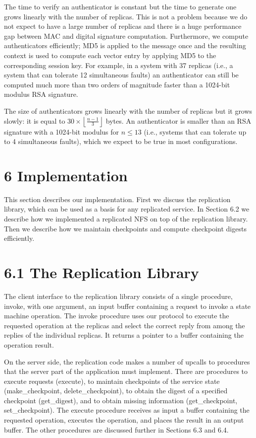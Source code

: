 \documentclass[
]{article}
\begin{document}
The time to verify an authenticator is constant but the time to generate
one grows linearly with the number of replicas. This is not a problem
because we do not expect to have a large number of replicas and there is
a huge performance gap between MAC and digital signature computation.
Furthermore, we compute authenticators efficiently; MD5 is applied to
the message once and the resulting context is used to compute each
vector entry by applying MD5 to the corresponding session key. For
example, in a system with 37 replicas (i.e., a system that can tolerate
12 simultaneous faults) an authenticator can still be computed much more
than two orders of magnitude faster than a 1024-bit modulus RSA
signature.

The size of authenticators grows linearly with the number of replicas
but it grows slowly: it is equal to
\(30 \times \left\lfloor \frac{n-1}{3} \right\rfloor\) bytes. An
authenticator is smaller than an RSA signature with a 1024-bit modulus
for \(n \leq 13\) (i.e., systems that can tolerate up to 4 simultaneous
faults), which we expect to be true in most configurations.

\section{6 Implementation}\label{implementation}

This section describes our implementation. First we discuss the
replication library, which can be used as a basis for any replicated
service. In Section 6.2 we describe how we implemented a replicated NFS
on top of the replication library. Then we describe how we maintain
checkpoints and compute checkpoint digests efficiently.

\section{6.1 The Replication Library}\label{the-replication-library}

The client interface to the replication library consists of a single
procedure, invoke, with one argument, an input buffer containing a
request to invoke a state machine operation. The invoke procedure uses
our protocol to execute the requested operation at the replicas and
select the correct reply from among the replies of the individual
replicas. It returns a pointer to a buffer containing the operation
result.

On the server side, the replication code makes a number of upcalls to
procedures that the server part of the application must implement. There
are procedures to execute requests (execute), to maintain checkpoints of
the service state (make\_checkpoint, delete\_checkpoint), to obtain the
digest of a specified checkpoint (get\_digest), and to obtain missing
information (get\_checkpoint, set\_checkpoint). The execute procedure
receives as input a buffer containing the requested operation, executes
the operation, and places the result in an output buffer. The other
procedures are discussed further in Sections 6.3 and 6.4.
\end{document}
